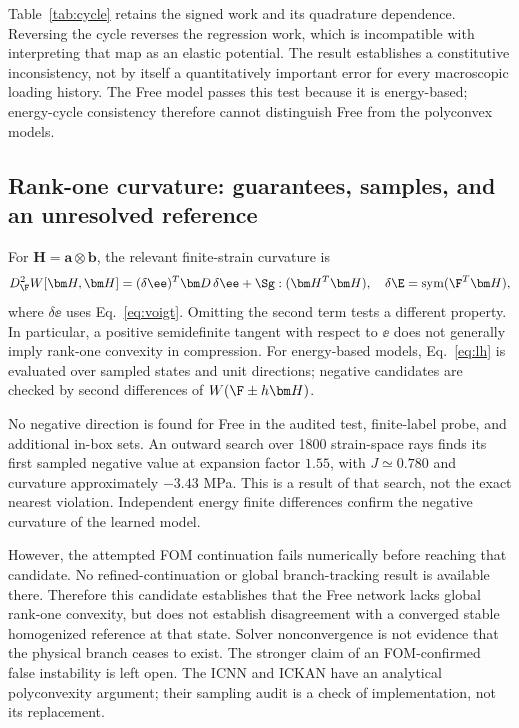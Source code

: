 Table~\ref{tab:cycle} retains the signed work and its quadrature dependence. Reversing the cycle reverses the regression work, which is incompatible with interpreting that map as an elastic potential. The result establishes a constitutive inconsistency, not by itself a quantitatively important error for every macroscopic loading history. The Free model passes this test because it is energy-based; energy-cycle consistency therefore cannot distinguish Free from the polyconvex models.
\begin{table}[htbp]
 \centering\small
 \caption{Closed-cycle work under quadrature refinement.}
 \label{tab:cycle}
 
\end{table}

\subsection{Rank-one curvature: guarantees, samples, and an unresolved reference}
For $\bm H=\bm a\otimes\bm b$, the relevant finite-strain curvature is
\begin{equation}
 D^2_{\F}W[\bm H,\bm H]
   =(\delta\ee)^T\bm D\,\delta\ee+\Sg:(\bm H^T\bm H),\quad
 \delta\E=\operatorname{sym}(\F^T\bm H),
 \label{eq:lh}
\end{equation}
where $\delta\ee$ uses Eq.~\eqref{eq:voigt}. Omitting the second term tests a different property. In particular, a positive semidefinite tangent with respect to $\ee$ does not generally imply rank-one convexity in compression. For energy-based models, Eq.~\eqref{eq:lh} is evaluated over sampled states and unit directions; negative candidates are checked by second differences of $W(\F\pm h\bm H)$.

\begin{table}[htbp]
 \centering\small
 \caption{Finite rank-one curvature audit. Positive sampled values do not establish a global property.}
 \label{tab:rankone}
 
\end{table}

No negative direction is found for Free in the audited test, finite-label probe, and additional in-box sets. An outward search over 1800 strain-space rays finds its first sampled negative value at expansion factor $1.55$, with $J\simeq0.780$ and curvature approximately $-3.43$ MPa. This is a result of that search, not the exact nearest violation. Independent energy finite differences confirm the negative curvature of the learned model.

However, the attempted FOM continuation fails numerically before reaching that candidate. No refined-continuation or global branch-tracking result is available there. Therefore this candidate establishes that the Free network lacks global rank-one convexity, but does not establish disagreement with a converged stable homogenized reference at that state. Solver nonconvergence is not evidence that the physical branch ceases to exist. The stronger claim of an FOM-confirmed false instability is left open. The ICNN and ICKAN have an analytical polyconvexity argument; their sampling audit is a check of implementation, not its replacement.

